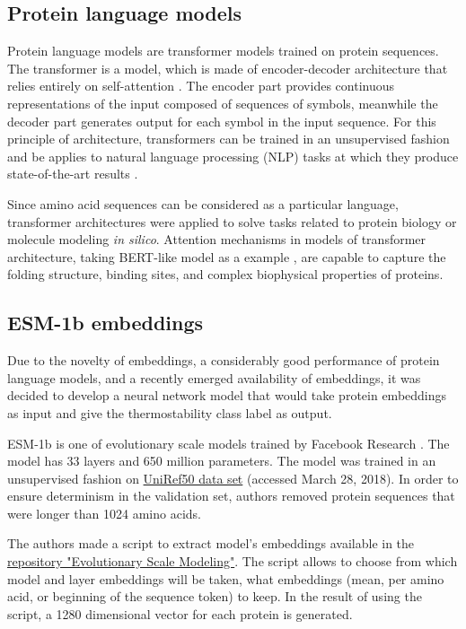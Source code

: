 \documentclass[12pt]{article}
\begin{document}
	\subsection{Protein language models}

	Protein language models are transformer models trained on protein sequences.
	The transformer is a model, which is made of encoder-decoder architecture 
	that relies entirely on self-attention \cite{vaswani2017attention}. 
	The encoder part provides continuous representations of the input composed 
	of sequences of symbols, meanwhile the decoder part generates output for each 
	symbol in the input sequence. For this principle of architecture, transformers
	can be trained in an unsupervised fashion and be applies to natural language
	processing (NLP) tasks at which they produce state-of-the-art 
	results \cite{vig2019analyzing}.

	Since amino acid sequences can be considered as a particular language, 
	transformer architectures were applied to solve tasks related to protein 
	biology or molecule modeling \textit{in silico}. Attention mechanisms in 
	models of transformer architecture, taking BERT-like model as a example 
	\cite{vig2020bertology}, are capable to capture the folding structure, 
	binding sites, and complex biophysical properties of proteins.

	\subsection{ESM-1b embeddings}

	Due to the novelty of embeddings, a considerably good performance of
	protein language models, and a recently emerged availability of embeddings,
	it was decided to develop a neural network model that would take protein
	embeddings as input and give the thermostability class
	label as output.

	ESM-1b is one of evolutionary scale models trained by Facebook Research 
	\cite{rives2021biological}. The model has 33 layers and 650 million parameters. 
	The model was trained in an 
	unsupervised fashion on 
	\href{ftp://ftp.uniprot.org/pub/databases/uniprot/uniref/uniref50}{UniRef50 data set}
	(accessed March 28, 2018)\cite{suzek2015uniref}. In order 
	to ensure
	determinism in the validation set, authors removed protein sequences that
	were longer than 1024 amino acids. 

	The authors made a script to extract model's embeddings available in the 
	\href{https://github.com/facebookresearch/esm}{repository "Evolutionary Scale Modeling"}.
	The script allows to choose 
	from which model and layer embeddings will be taken, what embeddings 
	(mean, per amino acid, or beginning of the sequence token) to keep. In the
	result of using the script, a 1280 dimensional vector for each protein is 
	generated.
	
\end{document}
